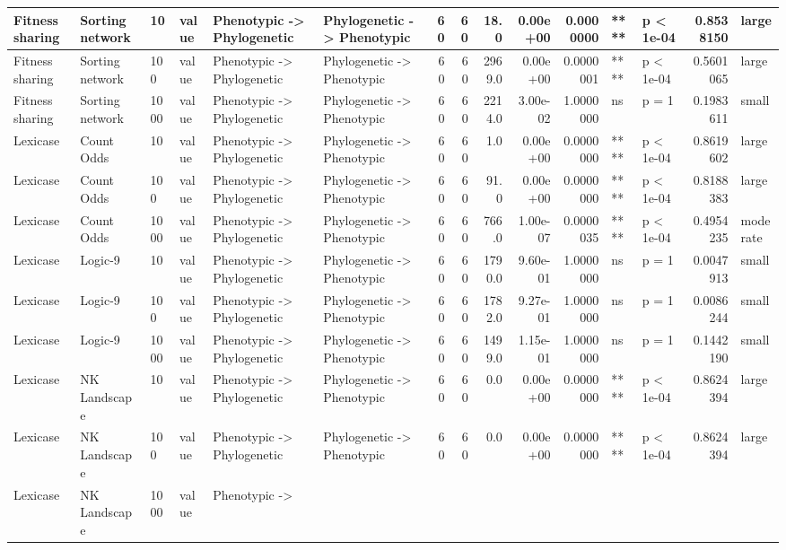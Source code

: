 \documentclass[]{book}
\begin{document}
\begin{table}
\begin{tabular}[t]{l|l|l|l|l|l|r|r|r|r|r|l|l|r|l}
Fitness sharing & Sorting network & 10 & value & Phenotypic
    ->
Phylogenetic & Phylogenetic
    ->
Phenotypic & 60 & 60 & 18.0 & 0.00e+00 & 0.0000000 & **** & p < 1e-04 & 0.8538150 & large\\
\hline
Fitness sharing & Sorting network & 100 & value & Phenotypic
    ->
Phylogenetic & Phylogenetic
    ->
Phenotypic & 60 & 60 & 2969.0 & 0.00e+00 & 0.0000001 & **** & p < 1e-04 & 0.5601065 & large\\
\hline
Fitness sharing & Sorting network & 1000 & value & Phenotypic
    ->
Phylogenetic & Phylogenetic
    ->
Phenotypic & 60 & 60 & 2214.0 & 3.00e-02 & 1.0000000 & ns & p = 1 & 0.1983611 & small\\
\hline
Lexicase & Count Odds & 10 & value & Phenotypic
    ->
Phylogenetic & Phylogenetic
    ->
Phenotypic & 60 & 60 & 1.0 & 0.00e+00 & 0.0000000 & **** & p < 1e-04 & 0.8619602 & large\\
\hline
Lexicase & Count Odds & 100 & value & Phenotypic
    ->
Phylogenetic & Phylogenetic
    ->
Phenotypic & 60 & 60 & 91.0 & 0.00e+00 & 0.0000000 & **** & p < 1e-04 & 0.8188383 & large\\
\hline
Lexicase & Count Odds & 1000 & value & Phenotypic
    ->
Phylogenetic & Phylogenetic
    ->
Phenotypic & 60 & 60 & 766.0 & 1.00e-07 & 0.0000035 & **** & p < 1e-04 & 0.4954235 & moderate\\
\hline
Lexicase & Logic-9 & 10 & value & Phenotypic
    ->
Phylogenetic & Phylogenetic
    ->
Phenotypic & 60 & 60 & 1790.0 & 9.60e-01 & 1.0000000 & ns & p = 1 & 0.0047913 & small\\
\hline
Lexicase & Logic-9 & 100 & value & Phenotypic
    ->
Phylogenetic & Phylogenetic
    ->
Phenotypic & 60 & 60 & 1782.0 & 9.27e-01 & 1.0000000 & ns & p = 1 & 0.0086244 & small\\
\hline
Lexicase & Logic-9 & 1000 & value & Phenotypic
    ->
Phylogenetic & Phylogenetic
    ->
Phenotypic & 60 & 60 & 1499.0 & 1.15e-01 & 1.0000000 & ns & p = 1 & 0.1442190 & small\\
\hline
Lexicase & NK Landscape & 10 & value & Phenotypic
    ->
Phylogenetic & Phylogenetic
    ->
Phenotypic & 60 & 60 & 0.0 & 0.00e+00 & 0.0000000 & **** & p < 1e-04 & 0.8624394 & large\\
\hline
Lexicase & NK Landscape & 100 & value & Phenotypic
    ->
Phylogenetic & Phylogenetic
    ->
Phenotypic & 60 & 60 & 0.0 & 0.00e+00 & 0.0000000 & **** & p < 1e-04 & 0.8624394 & large\\
\hline
Lexicase & NK Landscape & 1000 & value & Phenotypic
    ->

\end{tabular}
\end{table}
\end{document}
